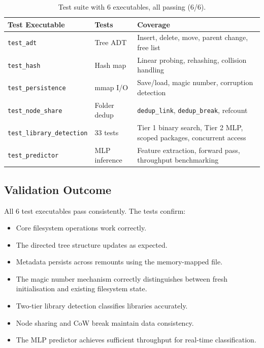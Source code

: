 \documentclass[12pt, a4paper]{article}
\begin{document}
\begin{table}[H]
\centering
\begin{tabular}{llp{6cm}}
\toprule
\textbf{Test Executable} & \textbf{Tests} & \textbf{Coverage} \\
\midrule
\texttt{test\_adt} & Tree ADT & Insert, delete, move, parent change, free list \\
\texttt{test\_hash} & Hash map & Linear probing, rehashing, collision handling \\
\texttt{test\_persistence} & mmap I/O & Save/load, magic number, corruption detection \\
\texttt{test\_node\_share} & Folder dedup & \texttt{dedup\_link}, \texttt{dedup\_break}, refcount \\
\texttt{test\_library\_detection} & 33 tests & Tier 1 binary search, Tier 2 MLP, scoped packages, concurrent access \\
\texttt{test\_predictor} & MLP inference & Feature extraction, forward pass, throughput benchmarking \\
\bottomrule
\end{tabular}
\caption{Test suite with 6 executables, all passing (6/6).}
\end{table}

\subsection{Validation Outcome}

All 6 test executables pass consistently. The tests confirm:
\begin{itemize}
  \item Core filesystem operations work correctly.
  \item The directed tree structure updates as expected.
  \item Metadata persists across remounts using the memory-mapped file.
  \item The magic number mechanism correctly distinguishes between fresh initialisation and existing filesystem state.
  \item Two-tier library detection classifies libraries accurately.
  \item Node sharing and CoW break maintain data consistency.
  \item The MLP predictor achieves sufficient throughput for real-time classification.
\end{itemize}

\end{document}
